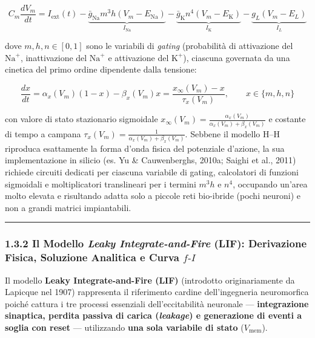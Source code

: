 \documentclass[11pt,a4paper]{article}
\begin{document}
\[
C_m \frac{dV_m}{dt} = I_{\text{ext}}(t) - \underbrace{\bar{g}_{\text{Na}} m^3 h (V_m - E_{\text{Na}})}_{I_{\text{Na}}} - \underbrace{\bar{g}_{\text{K}} n^4 (V_m - E_{\text{K}})}_{I_{\text{K}}} - \underbrace{g_L (V_m - E_L)}_{I_L}
\]

dove $m, h, n \in [0, 1]$ sono le variabili di \textit{gating} (probabilità di attivazione del $\text{Na}^+$, inattivazione del $\text{Na}^+$ e attivazione del $\text{K}^+$), ciascuna governata da una cinetica del primo ordine dipendente dalla tensione:

\[
\frac{dx}{dt} = \alpha_x(V_m)(1 - x) - \beta_x(V_m)x = \frac{x_\infty(V_m) - x}{\tau_x(V_m)}, \qquad x \in \{m, h, n\}
\]

con valore di stato stazionario sigmoidale $x_\infty(V_m) = \frac{\alpha_x(V_m)}{\alpha_x(V_m) + \beta_x(V_m)}$ e costante di tempo a campana $\tau_x(V_m) = \frac{1}{\alpha_x(V_m) + \beta_x(V_m)}$.
Sebbene il modello H--H riproduca esattamente la forma d'onda fisica del potenziale d'azione, la sua implementazione in silicio (es. Yu \& Cauwenberghs, 2010a; Saighi et al., 2011) richiede circuiti dedicati per ciascuna variabile di gating, calcolatori di funzioni sigmoidali e moltiplicatori translineari per i termini $m^3 h$ e $n^4$, occupando un'area molto elevata e risultando adatta solo a piccole reti bio-ibride (pochi neuroni) e non a grandi matrici impiantabili.

\bigskip\hrule\bigskip

\subsubsection{1.3.2 Il Modello \textit{Leaky Integrate-and-Fire} (LIF): Derivazione Fisica, Soluzione Analitica e Curva $f\text{-}I$}

Il modello \textbf{Leaky Integrate-and-Fire (LIF)} (introdotto originariamente da Lapicque nel 1907) rappresenta il riferimento cardine dell'ingegneria neuromorfica poiché cattura i tre processi essenziali dell'eccitabilità neuronale --- \textbf{integrazione sinaptica, perdita passiva di carica (\textit{leakage}) e generazione di eventi a soglia con reset} --- utilizzando \textbf{una sola variabile di stato} ($V_{\text{mem}}$).
\end{document}
